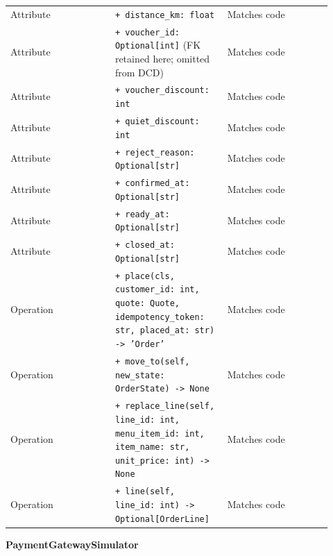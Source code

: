 \begin{longtable}{>{\raggedright\arraybackslash}p{0.3067\linewidth}>{\raggedright\arraybackslash}p{0.3067\linewidth}>{\raggedright\arraybackslash}p{0.3067\linewidth}}
Attribute & \texttt{+ distance\_\allowbreak{}km: float} & Matches code \\
Attribute & \texttt{+ voucher\_\allowbreak{}id: Optional[int]} (FK retained here; omitted from DCD) & Matches code \\
Attribute & \texttt{+ voucher\_\allowbreak{}discount: int} & Matches code \\
Attribute & \texttt{+ quiet\_\allowbreak{}discount: int} & Matches code \\
Attribute & \texttt{+ reject\_\allowbreak{}reason: Optional[str]} & Matches code \\
Attribute & \texttt{+ confirmed\_\allowbreak{}at: Optional[str]} & Matches code \\
Attribute & \texttt{+ ready\_\allowbreak{}at: Optional[str]} & Matches code \\
Attribute & \texttt{+ closed\_\allowbreak{}at: Optional[str]} & Matches code \\
Operation & \texttt{+ place(cls, customer\_\allowbreak{}id: int, quote: Quote, idempotency\_\allowbreak{}token: str, placed\_\allowbreak{}at: str) -\textgreater{} 'Order'} & Matches code \\
Operation & \texttt{+ move\_\allowbreak{}to(self, new\_\allowbreak{}state: OrderState) -\textgreater{} None} & Matches code \\
Operation & \texttt{+ replace\_\allowbreak{}line(self, line\_\allowbreak{}id: int, menu\_\allowbreak{}item\_\allowbreak{}id: int, item\_\allowbreak{}name: str, unit\_\allowbreak{}price: int) -\textgreater{} None} & Matches code \\
Operation & \texttt{+ line(self, line\_\allowbreak{}id: int) -\textgreater{} Optional[OrderLine]} & Matches code \\
\end{longtable}
\textbf{PaymentGatewaySimulator}


